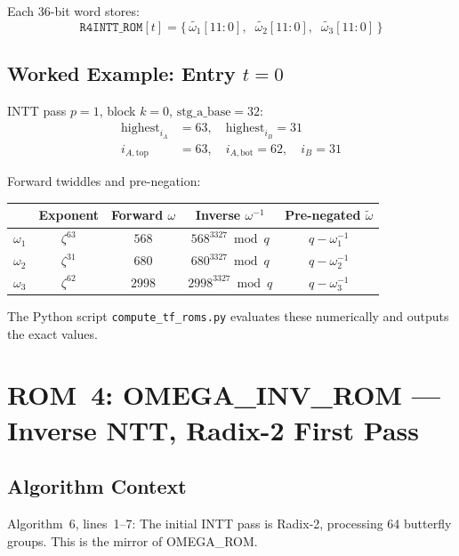 \documentclass[11pt,a4paper]{article}
\newcommand{\modneg}[1]{\widetilde{#1}}
\newcommand{\rom}[1]{\textsc{#1}}
\begin{document}
Each 36-bit word stores:
\[
  \texttt{R4INTT\_ROM}[t] = \bigl\{\,\modneg{\omega_1}[11\!:\!0],\;\; \modneg{\omega_2}[11\!:\!0],\;\; \modneg{\omega_3}[11\!:\!0]\,\bigr\}
\]

\subsection{Worked Example: Entry $t = 0$}

INTT pass $p=1$, block $k=0$, $\text{stg\_a\_base}=32$:
\begin{align*}
  \text{highest}_{i_A} &= 63, \quad \text{highest}_{i_B} = 31 \\
  i_{A,\text{top}} &= 63,\quad i_{A,\text{bot}} = 62,\quad i_B = 31
\end{align*}

Forward twiddles and pre-negation:
\begin{center}
\begin{tabular}{lcccc}
\toprule
& Exponent & Forward $\omega$ & Inverse $\omega^{-1}$ & Pre-negated $\modneg{\omega}$ \\
\midrule
$\omega_1$ & $\zeta^{63}$ & $568$  & $568^{3327}\!\bmod q$ & $q - \omega_1^{-1}$ \\
$\omega_2$ & $\zeta^{31}$ & $680$  & $680^{3327}\!\bmod q$ & $q - \omega_2^{-1}$ \\
$\omega_3$ & $\zeta^{62}$ & $2998$ & $2998^{3327}\!\bmod q$ & $q - \omega_3^{-1}$ \\
\bottomrule
\end{tabular}
\end{center}

The Python script \texttt{compute\_tf\_roms.py} evaluates these numerically and outputs the exact values.

\section{ROM~4: \rom{OMEGA\_INV\_ROM} --- Inverse NTT, Radix-2 First Pass}
\label{sec:omega-inv-rom}

\subsection{Algorithm Context}

Algorithm~6, lines~1--7: The initial INTT pass is Radix-2, processing 64 butterfly groups. This is the mirror of \rom{OMEGA\_ROM}.
\end{document}
